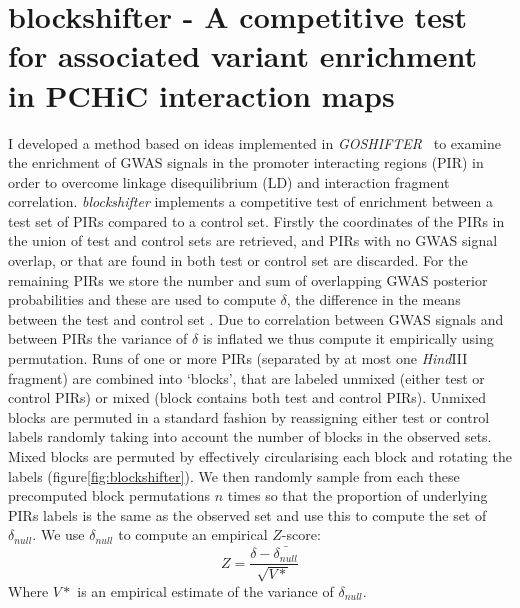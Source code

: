 \documentclass[a4paper,11pt]{report}
\begin{document}
\section{blockshifter - A competitive test for associated variant enrichment in PCHiC interaction maps}
I developed a method based on ideas implemented in \textit{GOSHIFTER}~\citep{Trynka2015-wz} to examine the enrichment of GWAS signals in the promoter interacting regions (PIR) in order to overcome linkage disequilibrium (LD) and interaction fragment correlation. \textit{blockshifter}  implements a competitive test of enrichment between a test set of PIRs compared to a control set. Firstly the coordinates of the PIRs in the union of test and control sets are retrieved, and PIRs with no GWAS signal overlap, or that are found in both test or control set are discarded. For the remaining PIRs we store the number and sum of overlapping GWAS posterior probabilities and these are used to compute $\delta$, the difference in the means between the test and control set . Due to correlation between GWAS signals and between PIRs the variance of $\delta$ is inflated we thus compute it empirically using permutation.  Runs of one or more PIRs (separated by at most one \textit{Hind}III fragment) are combined into ‘blocks’, that are labeled unmixed (either test or control PIRs) or mixed (block contains both test and control PIRs).  Unmixed blocks are permuted in a standard fashion by reassigning either test or control labels randomly taking into account the number of blocks in the observed sets. Mixed blocks are permuted by effectively circularising each block and rotating the labels (figure\ref{fig:blockshifter}). We then randomly sample from each these precomputed block permutations $n$ times so that the proportion of underlying PIRs labels is the same as the observed set and use this to compute the set of $\delta_{null}$. We use $\delta_{null}$ to compute an empirical $Z$-score:
\begin{equation}
Z = \frac{\delta - \bar{\delta_{null}}}{\sqrt{V*}}
\end{equation}
Where $V*$ is an empirical estimate of the variance of $\delta_{null}$. 
\end{document}
